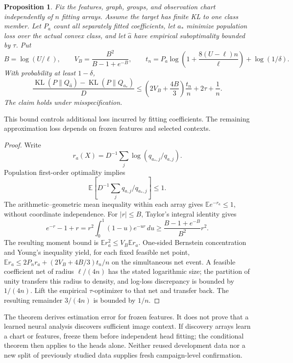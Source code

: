 \documentclass[11pt]{article}
\newtheorem{proposition}{Proposition}
\newcommand{\E}{\mathbb E}
\begin{document}
\begin{proposition}
Fix the features, graph, groups, and observation chart independently of $n$ fitting arrays. Assume the target has finite KL to one class member. Let $P_a$ count all separately fitted coefficients, let $a_*$ minimize population loss over the actual convex class, and let $\widehat a$ have empirical suboptimality bounded by $\tau$. Put
\begin{equation}
 B=\log(U/\ell),\qquad V_B=\frac{B^2}{B-1+e^{-B}},\qquad
 t_n=P_a\log\!\left(1+\frac{8(U-\ell)n}{\ell}\right)+\log(1/\delta).
\end{equation}
With probability at least $1-\delta$,
\begin{equation}
 \frac{\operatorname{KL}(P\|Q_{\widehat a})-\operatorname{KL}(P\|Q_{a_*})}{D}
 \le\left(2V_B+\frac{4B}{3}\right)\frac{t_n}{n}+2\tau+\frac1n.
\end{equation}
The claim holds under misspecification.
\end{proposition}
This bound controls additional loss incurred by fitting coefficients. The remaining approximation loss depends on frozen features and selected contexts.
\begin{proof}
Write
\[
 r_a(X)=D^{-1}\sum_j\log(q_{a_*,j}/q_{a,j}).
\]
Population first-order optimality implies
\[
 \E\left[D^{-1}\sum_j q_{a,j}/q_{a_*,j}\right]\le1.
\]
The arithmetic--geometric mean inequality within each array gives $\E e^{-r_a}\le1$, without coordinate independence. For $|r|\le B$, Taylor's integral identity gives
\begin{equation}
 e^{-r}-1+r=r^2\int_0^1(1-u)e^{-ur}\,du
 \ge \frac{B-1+e^{-B}}{B^2}r^2.
\end{equation}
The resulting moment bound is $\E r_a^2\le V_B\E r_a$. One-sided Bernstein concentration and Young's inequality yield, for each fixed feasible net point,
$\E r_a\le2P_n r_a+(2V_B+4B/3)t_n/n$ on the simultaneous net event. A feasible coefficient net of radius $\ell/(4n)$ has the stated logarithmic size; the partition of unity transfers this radius to density, and log-loss discrepancy is bounded by $1/(4n)$. Lift the empirical $\tau$-optimizer to that net and transfer back. The resulting remainder $3/(4n)$ is bounded by $1/n$.
\end{proof}
The theorem derives estimation error for frozen features. It does not prove that a learned neural analysis discovers sufficient image context. If discovery arrays learn a chart or features, freeze them before independent head fitting; the conditional theorem then applies to the heads alone. Neither reused development data nor a new split of previously studied data supplies fresh campaign-level confirmation.
\end{document}
